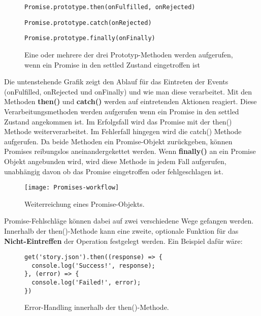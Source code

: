 \begin{description}

\begin{figure}[H]
\item \begin{lstlisting}[basicstyle=\small]
Promise.prototype.then(onFulfilled, onRejected)
\end{lstlisting}

\item \begin{lstlisting}[basicstyle=\small]
Promise.prototype.catch(onRejected)
\end{lstlisting}


\item \begin{lstlisting}[basicstyle=\small]
Promise.prototype.finally(onFinally)
\end{lstlisting}
\caption{Eine oder mehrere der drei Prototyp-Methoden werden aufgerufen, wenn ein Promise in den settled Zustand eingetroffen ist}
\end{figure}

\end{description}

\noindent
Die untenstehende Grafik zeigt den Ablauf für das Eintreten der Events (onFulfilled, onRejected und onFinally) und wie man diese verarbeitet. Mit den Methoden \textbf{then()} und \textbf{catch()} werden auf eintretenden Aktionen reagiert. Diese Verarbeitungsmethoden werden aufgerufen wenn ein Promise in den settled Zustand angekommen ist. Im Erfolgsfall wird das Promise mit der then() Methode weiterverarbeitet. Im Fehlerfall hingegen wird die catch() Methode aufgerufen. Da beide Methoden ein Promise-Objekt zurückgeben, können Promises reibungslos aneinandergekettet werden. Wenn \textbf{finally()} an ein Promise Objekt angebunden wird, wird diese Methode in jedem Fall aufgerufen, unabhängig davon ob das Promise eingetroffen oder fehlgeschlagen ist.

\begin{figure}[H]
\texttt{[image: Promises-workflow]}
\caption{Weiterreichung eines Promise-Objekts\cite{promise-executor}.}
\end{figure}

\noindent
Promise-Fehlschläge können dabei auf zwei verschiedene Wege gefangen werden. Innerhalb der then()-Methode kann eine zweite, optionale Funktion für das \textbf{Nicht-Eintreffen} der Operation festgelegt werden. Ein Beispiel dafür wäre:

\begin{figure}[H]
\begin{lstlisting}[basicstyle=\small]
get('story.json').then((response) => {
  console.log('Success!', response);
}, (error) => {
  console.log('Failed!', error);
})
\end{lstlisting}
\caption{Error-Handling innerhalb der then()-Methode\cite{callback-vs-promises}.}
\end{figure}

